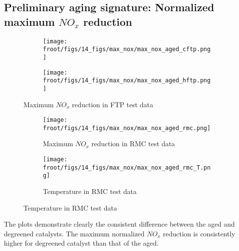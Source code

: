 \subsection{Preliminary aging signature: Normalized maximum $NO_x$ reduction}

\begin{figure}[H]
        \begin{minipage}{0.49\textwidth}
                \begin{figure}[H]
                        \centering
                        \texttt{[image: \\froot/figs/14\_figs/max\_nox/max\_nox\_aged\_cftp.png]}
                \end{figure}
        \end{minipage}
        \begin{minipage}{0.49\textwidth}
                \begin{figure}[H]
                        \centering
                        \texttt{[image: \\froot/figs/14\_figs/max\_nox/max\_nox\_aged\_hftp.png]}
                \end{figure}
        \end{minipage}
        \caption{Maximum $NO_x$ reduction in FTP test data}
\end{figure}

\begin{figure}[H]
        \begin{minipage}{0.49\textwidth}
                \begin{figure}[H]
                        \centering
                        \texttt{[image: \\froot/figs/14\_figs/max\_nox/max\_nox\_aged\_rmc.png]}
                        \caption{Maximum $NO_x$ reduction in RMC test data}
                \end{figure}
        \end{minipage}
        \begin{minipage}{0.49\textwidth}
                \begin{figure}[H]
                        \centering
                        \texttt{[image: \\froot/figs/14\_figs/max\_nox/max\_nox\_aged\_rmc\_T.png]}
                        \caption{Temperature in RMC test data}
                \end{figure}
        \end{minipage}
\end{figure}

The plots demonstrate clearly the consistent difference between the aged and degreened catalysts. The maximum normalized $NO_x$ reduction is consistently higher for degreened catalyst than that of the aged.
